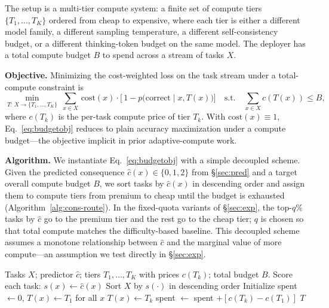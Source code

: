 \documentclass{article}
\begin{document}
The setup is a multi-tier compute system: a finite set of compute tiers $\{T_1, \ldots, T_K\}$ ordered from cheap to expensive, where each tier is either a different model family, a different sampling temperature, a different self-consistency budget, or a different thinking-token budget on the same model. The deployer has a total compute budget $B$ to spend across a stream of tasks $X$.

\textbf{Objective.} Minimizing the cost-weighted loss on the task stream under a total-compute constraint is
\begin{equation}\label{eq:budgetobj}
\min_{T:\,X\to\{T_1,\dots,T_K\}}\ \sum_{x\in X}\, \mathrm{cost}(x)\cdot
\bigl[\,1 - p\bigl(\text{correct}\mid x, T(x)\bigr)\bigr]
\quad\text{s.t.}\quad
\sum_{x\in X} c(T(x)) \leq B,
\end{equation}
where $c(T_k)$ is the per-task compute price of tier $T_k$. With
$\mathrm{cost}(x){\equiv}1$, Eq.~\ref{eq:budgetobj} reduces to plain
accuracy maximization under a compute budget---the objective implicit in prior adaptive-compute work.

\textbf{Algorithm.} We instantiate Eq.~\ref{eq:budgetobj} with a simple decoupled scheme. Given the predicted consequence $\hat{c}(x) \in \{0,1,2\}$ from \S\ref{sec:pred} and a target overall
compute budget $B$, we sort tasks by $\hat{c}(x)$ in descending order and assign them to compute tiers from premium to cheap until the
budget is exhausted (Algorithm~\ref{alg:cons-route}). In the fixed-quota variants of \S\ref{sec:exp}, the top-$q\%$ tasks by
$\hat{c}$ go to the premium tier and the rest go to the cheap tier;
$q$ is chosen so that total compute matches the difficulty-based baseline. This decoupled scheme assumes a monotone relationship between $\hat{c}$ and the marginal value of more compute---an
assumption we test directly in \S\ref{sec:exp}.

\begin{algorithm}
\caption{Cost-weighted compute allocation}\label{alg:cons-route}
\begin{algorithmic}[1]
\REQUIRE Tasks $X$; predictor $\hat{c}$; tiers $T_1, \ldots, T_K$ with prices $c(T_k)$; total budget $B$.
\STATE Score each task: $s(x) \leftarrow \hat{c}(x)$
\STATE Sort $X$ by $s(\cdot)$ in descending order
\STATE Initialize spent $\leftarrow 0$, $T(x) \leftarrow T_1$ for all $x$
      \STATE $T(x) \leftarrow T_k$
      \STATE spent $\leftarrow$ spent $+ [c(T_k) - c(T_1)]$
    \ENDIF
  \ENDFOR
\ENDFOR
\RETURN $T$
\end{algorithmic}
\end{algorithm}
\end{document}
